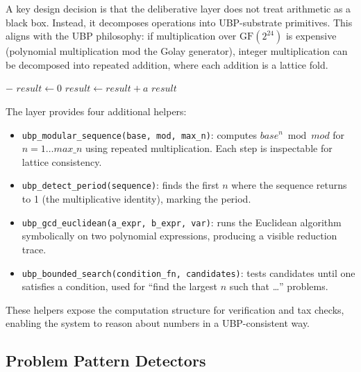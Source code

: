 \documentclass[11pt,a4paper]{article}
\begin{document}
A key design decision is that the deliberative layer does not treat arithmetic as a black box. Instead, it decomposes operations into UBP-substrate primitives. This aligns with the UBP philosophy: if multiplication over $\mathrm{GF}(2^{24})$ is expensive (polynomial multiplication mod the Golay generator), integer multiplication can be decomposed into repeated addition, where each addition is a lattice fold.

\begin{algorithm}
\caption{UBP-native repeated multiplication}
\label{alg:repeated_mult}
\begin{algorithmic}[1]
     \Return $-$ \EndIf
    \State $result \gets 0$
        \State $result \gets result + a$ 
    \EndFor
    \State \Return $result$
\EndFunction
\end{algorithmic}
\end{algorithm}

The layer provides four additional helpers:

\begin{itemize}
    \item \texttt{ubp\_modular\_sequence(base, mod, max\_n)}: computes $base^n \bmod mod$ for $n = 1 \ldots max\_n$ using repeated multiplication. Each step is inspectable for lattice consistency.
    \item \texttt{ubp\_detect\_period(sequence)}: finds the first $n$ where the sequence returns to 1 (the multiplicative identity), marking the period.
    \item \texttt{ubp\_gcd\_euclidean(a\_expr, b\_expr, var)}: runs the Euclidean algorithm symbolically on two polynomial expressions, producing a visible reduction trace.
    \item \texttt{ubp\_bounded\_search(condition\_fn, candidates)}: tests candidates until one satisfies a condition, used for ``find the largest $n$ such that \ldots'' problems.
\end{itemize}

These helpers expose the computation structure for verification and tax checks, enabling the system to reason about numbers in a UBP-consistent way.

\subsection{Problem Pattern Detectors}
\end{document}
